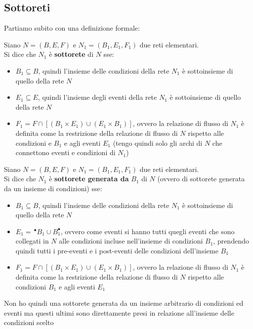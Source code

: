 \documentclass[a4paper,12pt, oneside]{book}
\begin{document}
\subsection{Sottoreti}
Partiamo subito con una definizione formale:
\begin{definizione}
  Siano $N=(B,E,F)$ e $N_1=(B_1,E_1,F_1)$ due reti elementari.\\
  Si dice che $N_1$ è \textbf{sottorete} di $N$ sse:
  \begin{itemize}
    \item $B_1\subseteq B$, quindi l'insieme delle condizioni della rete $N_1$
    è sottoinsieme di quello della rete $N$
    \item $E_1\subseteq E$, quindi l'insieme degli eventi della rete $N_1$
    è sottoinsieme di quello della rete $N$
    \item $F_1=F\cap[(B_1\times E_1)\cup (E_1\times B_1)]$, ovvero la relazione
    di flusso di $N_1$ è definita come la restrizione della relazione di flusso
    di $N$ rispetto alle condizioni e $B_1$ e agli eventi $E_1$ (tengo quindi solo
    gli archi di $N$ che connettono eventi e condizioni di $N_1$)
  \end{itemize}
\end{definizione}
\begin{definizione}
  Siano $N=(B,E,F)$ e $N_1=(B_1,E_1,F_1)$ due reti elementari.\\
  Si dice che $N_1$ è \textbf{sottorete generata da} $B_1$ di $N$ (ovvero di
  sottorete generata da un insieme di condizioni) sse:
  \begin{itemize}
    \item $B_1\subseteq B$, quindi l'insieme delle condizioni della rete $N_1$
    è sottoinsieme di quello della rete $N$
    \item $E_1=\, ^\bullet B_1\cup B_1^\bullet$, ovvero come eventi si
    hanno tutti quegli eventi che sono collegati in $N$ alle condizioni incluse
    nell'insieme di condizioni $B_1$, prendendo quindi tutti i pre-eventi e i
    post-eventi delle condizioni dell'insieme $B_1$
    \item $F_1=F\cap[(B_1\times E_1)\cup (E_1\times B_1)]$, ovvero la relazione
    di flusso di $N_1$ è definita come la restrizione della relazione di flusso
    di $N$ rispetto alle condizioni $B_1$ e agli eventi $E_1$
  \end{itemize}
  Non ho quindi una sottorete generata da un insieme arbitrario di condizioni ed
  eventi ma questi ultimi sono direttamente presi in relazione all'insieme delle
  condizioni scelto
\end{definizione}
\end{document}
